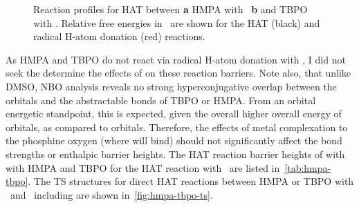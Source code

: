 \begin{figure}[!htbp]
  \setcounter{subfigure}{0}
  \centering

  \caption[Reaction profiles for HAT between HMPA with \bno\, and TBPO with
  \bno.]{Reaction profiles for HAT between \textbf{a} HMPA with \bno\,
  \textbf{b} and TBPO with \bno. Relative free energies in \kcalmol\ are shown
  for the HAT (black) and radical H-atom donation (red) reactions.}
  \label{fig:hmpa-tbpo-bno}
\end{figure}


As HMPA and TBPO do not react via radical H-atom donation with \bno, I did not
seek the determine the effects of  on these reaction barriers. Note
also, that unlike DMSO, NBO analysis reveals no strong hyperconjugative overlap
between the  orbitals and the abstractable  bonds of TBPO or
HMPA. From an orbital energetic standpoint, this is expected, given the overall
higher overall energy of  orbitals, as compared to  orbitals.
Therefore, the effects of metal complexation to the phosphine oxygen (where
 will bind) should not significantly affect the  bond strengths
or enthalpic barrier heights. The HAT reaction barrier heights of  with
with HMPA and TBPO for the HAT reaction with \cumo\ are listed
in~\ref{tab:hmpa-tbpo}. The TS structures for direct HAT reactions between HMPA
or TBPO with \cumo\ and \bno\ including  are shown
in~\ref{fig:hmpa-tbpo-ts}.



